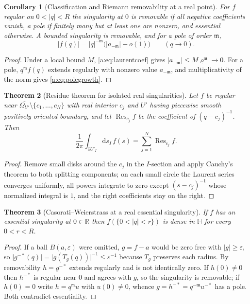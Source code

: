 \documentclass[11pt,a4paper]{article}
\numberwithin{equation}{section}
\newtheorem{theorem}{Theorem}[section]
\newtheorem{corollary}[theorem]{Corollary}
\theoremstyle{definition}
\theoremstyle{remark}
\theoremstyle{plain}
\newcommand{\HH}{\mathbb H}
\newcommand{\RR}{\mathbb R}
\newcommand{\Om}{\Omega}
\newcommand{\abs}[1]{\lvert #1\rvert}
\newcommand{\dd}{\mathrm d}
\newcommand{\Res}{\operatorname{Res}}
\begin{document}
\begin{corollary}[Classification and Riemann removability at a real point]
\label{a:cor:removable-slice}
For $f$ regular on $0<\abs q<R$ the singularity at $0$ is removable if all
negative coefficients vanish, a pole if finitely many but at least one are
nonzero, and essential otherwise. A bounded singularity is removable, and for
a pole of order $\mathfrak m$,
\begin{equation}
 \abs{f(q)}=\abs q^{-\mathfrak m}\bigl(\abs{a_{-\mathfrak m}}+o(1)\bigr)
 \qquad(q\to0).
 \label{a:eq:polegrowth}
\end{equation}
\end{corollary}

\begin{proof}
Under a local bound $M$, \eqref{a:eq:laurentcoef} gives
$\abs{a_{-\mathfrak m}}\le M\varrho^{\mathfrak m}\to0$. For a pole,
$q^{\mathfrak m}f(q)$ extends regularly with nonzero value
$a_{-\mathfrak m}$, and multiplicativity of the norm gives
\eqref{a:eq:polegrowth}.
\end{proof}

\begin{theorem}[Residue theorem for isolated real singularities]
\label{a:thm:residue-slice}
Let $f$ be regular near $\overline{\Om_{U'}}\setminus\{c_1,\dots,c_N\}$ with
real interior $c_j$ and $U'$ having piecewise smooth positively oriented
boundary, and let $\Res_{c_j}f$ be the coefficient of $(q-c_j)^{-1}$. Then
\begin{equation}
 \frac1{2\pi}\int_{\partial U'_I}\dd s_I\,f(s)=\sum_{j=1}^N\Res_{c_j}f .
 \label{a:eq:residue-slice}
\end{equation}
\end{theorem}

\begin{proof}
Remove small disks around the $c_j$ in the $I$-section and apply Cauchy's
theorem to both splitting components; on each small circle the Laurent series
converges uniformly, all powers integrate to zero except $(s-c_j)^{-1}$ whose
normalized integral is $1$, and the right coefficients stay on the right.
\end{proof}

\begin{theorem}[Casorati--Weierstrass at a real essential singularity]
\label{a:thm:casorati}
If $f$ has an essential singularity at $0\in\RR$ then $f(\{0<\abs q<r\})$ is
dense in $\HH$ for every $0<r<R$.
\end{theorem}

\begin{proof}
If a ball $B(a,\varepsilon)$ were omitted, $g=f-a$ would be zero free with
$\abs g\ge\varepsilon$, so
$\abs{g^{-*}(q)}=\abs{g(T_g(q))}^{-1}\le\varepsilon^{-1}$ because $T_g$
preserves each radius. By removability $h=g^{-*}$ extends regularly and is not
identically zero. If $h(0)\ne0$ then $h^{-*}$ is regular near $0$ and agrees
with $g$, so the singularity is removable; if $h(0)=0$ write $h=q^{\mathfrak m}u$
with $u(0)\ne0$, whence $g=h^{-*}=q^{-\mathfrak m}u^{-*}$ has a pole. Both
contradict essentiality.
\end{proof}
\end{document}
